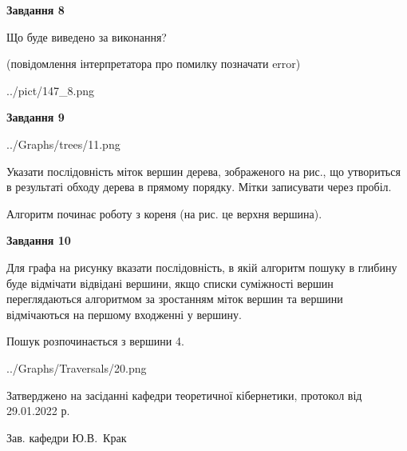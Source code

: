 \documentclass[12pt, ukrainian]{article}
\begin{document}
{\begin {large}
{\begin {center}\textbf{Завдання 8}\end {center}}\par
Що буде виведено за виконання?\par
 (повідомлення інтерпретатора про помилку позначати error)\par
\begin{center}
	{../pict/147_8.png}
\end{center}
\newpage

{\begin {center}\textbf{Завдання 9}\end {center}}\par

\begin{center}
	{../Graphs/trees/11.png}
\end{center}
Указати послідовність міток вершин дерева, зображеного на рис., що утвориться в результаті обходу дерева в прямому порядку. Мітки записувати через пробіл.\par Алгоритм починає роботу з кореня (на рис. це верхня вершина).\par
\newpage

{\begin {center}\textbf{Завдання 10}\end {center}}\par
Для графа на рисунку вказати послідовність, в якій алгоритм пошуку в глибину буде відмічати відвідані вершини, якщо списки суміжності вершин переглядаються алгоритмом за зростанням міток вершин та вершини відмічаються на першому вход\-женні у вершину.\par
Пошук розпочинається з вершини 4.\par

\begin{center}
	{../Graphs/Traversals/20.png}
\end{center}\par
\newpage


\end {large}
}
{\smallskip \begin {small} Затверджено на засіданні кафедри теоретичної кібернетики, протокол  від   29.01.2022 р.\par\smallskip\smallskip
{\parbox {6.5 cm}{Зав. кафедри \dotfill Ю.В.~Крак}} \end{small}}
\end{document}

